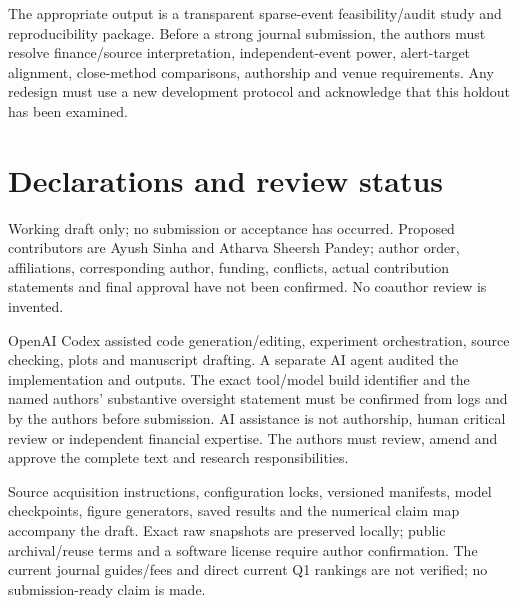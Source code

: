 \documentclass[11pt]{article}
\begin{document}
The appropriate output is a transparent sparse-event feasibility/audit study and reproducibility package. Before a strong journal submission, the authors must resolve finance/source interpretation, independent-event power, alert-target alignment, close-method comparisons, authorship and venue requirements. Any redesign must use a new development protocol and acknowledge that this holdout has been examined.

\section{Declarations and review status}
Working draft only; no submission or acceptance has occurred. Proposed contributors are Ayush Sinha and Atharva Sheersh Pandey; author order, affiliations, corresponding author, funding, conflicts, actual contribution statements and final approval have not been confirmed. No coauthor review is invented.

OpenAI Codex assisted code generation/editing, experiment orchestration, source checking, plots and manuscript drafting. A separate AI agent audited the implementation and outputs. The exact tool/model build identifier and the named authors' substantive oversight statement must be confirmed from logs and by the authors before submission. AI assistance is not authorship, human critical review or independent financial expertise. The authors must review, amend and approve the complete text and research responsibilities.

Source acquisition instructions, configuration locks, versioned manifests, model checkpoints, figure generators, saved results and the numerical claim map accompany the draft. Exact raw snapshots are preserved locally; public archival/reuse terms and a software license require author confirmation. The current journal guides/fees and direct current Q1 rankings are not verified; no submission-ready claim is made.
\end{document}
